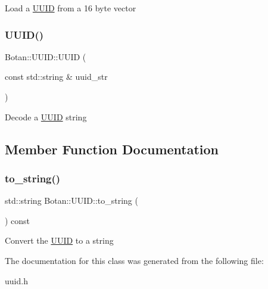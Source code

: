 Load a \hyperlink{class_botan_1_1_u_u_i_d}{U\+U\+ID} from a 16 byte vector \mbox{\label{class_botan_1_1_u_u_i_d_a621acc4dc66a8a330048588b23f61ae3}} 
\subsubsection{\texorpdfstring{U\+U\+I\+D()}{UUID()}\hspace{0.1cm}{\footnotesize\ttfamily [4/4]}}
{\footnotesize\ttfamily Botan\+::\+U\+U\+I\+D\+::\+U\+U\+ID (\begin{DoxyParamCaption}\item[{const std\+::string \&}]{uuid\+\_\+str }\end{DoxyParamCaption})}

Decode a \hyperlink{class_botan_1_1_u_u_i_d}{U\+U\+ID} string 

\subsection{Member Function Documentation}
\mbox{\label{class_botan_1_1_u_u_i_d_a707abb917ddb4996dbe987015cfac23c}} 
\subsubsection{\texorpdfstring{to\+\_\+string()}{to\_string()}}
{\footnotesize\ttfamily std\+::string Botan\+::\+U\+U\+I\+D\+::to\+\_\+string (\begin{DoxyParamCaption}{ }\end{DoxyParamCaption}) const}

Convert the \hyperlink{class_botan_1_1_u_u_i_d}{U\+U\+ID} to a string 

The documentation for this class was generated from the following file\+:\begin{DoxyCompactItemize}
\item 
uuid.\+h\end{DoxyCompactItemize}
